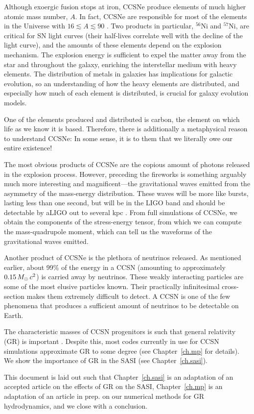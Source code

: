 Although exoergic fusion stops at iron,
CCSNe produce elements of much higher atomic mass number, $A$.
In fact, CCSNe are responsible for most of the elements in the Universe with
$16\lesssim A\lesssim90$ \citep{bw2017}.
Two products in particular, $^{56}$Ni and $^{57}$Ni, are critical for SN light
curves (their half-lives correlate well with the decline of the light curve),
and the amounts of these elements depend on the explosion mechanism.
The explosion energy is sufficient to expel the matter away from the star
and throughout the galaxy, enriching the interstellar medium with heavy
elements.
The distribution of metals in galaxies has implications for galactic
evolution, so an understanding of how the heavy elements are distributed,
and especially how much of each element is distributed,
is crucial for galaxy evolution models.

One of the elements produced and distributed is carbon,
the element on which life as we know it is based.
Therefore, there is additionally
a metaphysical reason to understand CCSNe:
In some sense, it is to them that we literally owe our entire existence!

The most obvious products of CCSNe are the copious amount of photons
released in the explosion process.
However, preceding the fireworks is something arguably much more interesting
and magnificent---the gravitational waves emitted from the asymmetry of the
mass-energy distribution.
These waves will be more like bursts, lasting less than one second,
but will be in the LIGO band and should be detectable by aLIGO
out to several kpc \citep{aaa2016}.
From full simulations of CCSNe, we obtain the components of the stress-energy
tensor, from which we can compute the mass-quadrupole moment,
which can tell us the waveforms of the gravitational waves emitted.

Another product of CCSNe is the plethora of neutrinos released.
As mentioned earlier, about 99\% of the energy in a CCSN
(amounting to approximately $0.15\,M_{\odot}\,c^{2}$) is carried away by neutrinos.
These weakly interacting particles are some of the most elusive particles known.
Their practically infinitesimal cross-section makes them extremely difficult
to detect.
A CCSN is one of the few phenomena that produces a sufficient amount of
neutrinos to be detectable on Earth.

The characteristic masses of CCSN progenitors is such that general relativity
(GR) is important \citep[e.g., see][]{lmt2001}.
Despite this, most codes currently in use for CCSN simulations
approximate GR to some degree (see Chapter~\ref{ch.mp} for details).
We show the importance of GR in the SASI (see Chapter~\ref{ch.sasi}).

This document is laid out such that Chapter~\ref{ch.sasi} is an adaptation
of an accepted article on the effects of GR on the SASI,
Chapter~\ref{ch.mp} is an adaptation of an article in prep. on our
numerical methods for GR hydrodynamics,
and we close with a conclusion.


